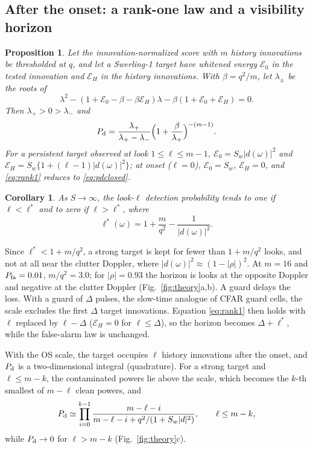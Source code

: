 \documentclass[journal]{IEEEtran}
\newtheorem{proposition}{Proposition}
\newtheorem{corollary}{Corollary}
\begin{document}
\subsection{After the onset: a rank-one law and a visibility horizon}
\begin{proposition}\label{prop:rank1}
Let the innovation-normalized score with $m$ history innovations be thresholded at $q$, and let a Swerling-1 target have whitened energy $\mathcal E_0$ in the tested innovation and $\mathcal E_H$ in the history innovations. With $\beta=q^2/m$, let $\lambda_\pm$ be the roots of
\[
\lambda^2-(1+\mathcal E_0-\beta-\beta\mathcal E_H)\lambda-\beta(1+\mathcal E_0+\mathcal E_H)=0 .
\]
Then $\lambda_+>0>\lambda_-$ and
\begin{equation}
P_{\rm d}=\frac{\lambda_+}{\lambda_+-\lambda_-}\Big(1+\frac{\beta}{\lambda_+}\Big)^{-(m-1)}.
\label{eq:rank1}
\end{equation}
For a persistent target observed at look $1\le\ell\le m-1$, $\mathcal E_0=S_w|d(\omega)|^2$ and $\mathcal E_H=S_w\{1+(\ell-1)|d(\omega)|^2\}$; at onset ($\ell=0$), $\mathcal E_0=S_w$, $\mathcal E_H=0$, and \eqref{eq:rank1} reduces to \eqref{eq:pdclosed}.
\end{proposition}
\begin{corollary}\label{cor:horizon}
As $S\to\infty$, the look-$\ell$ detection probability tends to one if $\ell<\ell^*$ and to zero if $\ell>\ell^*$, where
\begin{equation}
\ell^*(\omega)=1+\frac{m}{q^2}-\frac{1}{|d(\omega)|^2}.
\label{eq:horizon}
\end{equation}
\end{corollary}
Since $\ell^*<1+m/q^2$, a strong target is kept for fewer than $1+m/q^2$ looks, and not at all near the clutter Doppler, where $|d(\omega)|^2\approx(1-|\rho|)^2$. At $m=16$ and $P_{\rm fa}=0.01$, $m/q^2=3.0$; for $|\rho|=0.93$ the horizon is \ThHorizonOpp{} looks at the opposite Doppler and negative at the clutter Doppler (Fig.~\ref{fig:theory}a,b). A guard delays the loss. With a guard of $\Delta$ pulses, the slow-time analogue of CFAR guard cells, the scale excludes the first $\Delta$ target innovations. Equation \eqref{eq:rank1} then holds with $\ell$ replaced by $\ell-\Delta$ ($\mathcal E_H=0$ for $\ell\le\Delta$), so the horizon becomes $\Delta+\ell^*$, while the false-alarm law is unchanged.

With the OS scale, the target occupies $\ell$ history innovations after the onset, and $P_{\rm d}$ is a two-dimensional integral (quadrature). For a strong target and $\ell\le m-k$, the contaminated powers lie above the scale, which becomes the $k$-th smallest of $m-\ell$ clean powers, and
\begin{equation}
P_{\rm d}\simeq\prod_{i=0}^{k-1}\frac{m-\ell-i}{m-\ell-i+q^2/(1+S_w|d|^2)},\qquad \ell\le m-k,
\label{eq:osstrong}
\end{equation}
while $P_{\rm d}\to0$ for $\ell>m-k$ (Fig.~\ref{fig:theory}c).
\end{document}
